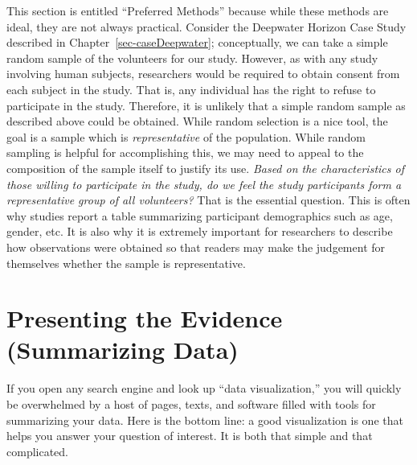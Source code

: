 \documentclass[
  letterpaper,
  DIV=11,
  numbers=noendperiod]{scrreprt}
\theoremstyle{definition}
\theoremstyle{definition}
\theoremstyle{plain}
\theoremstyle{remark}
\begin{document}
This section is entitled ``Preferred Methods'' because while these
methods are ideal, they are not always practical. Consider the Deepwater
Horizon Case Study described in Chapter~\ref{sec-caseDeepwater};
conceptually, we can take a simple random sample of the volunteers for
our study. However, as with any study involving human subjects,
researchers would be required to obtain consent from each subject in the
study. That is, any individual has the right to refuse to participate in
the study. Therefore, it is unlikely that a simple random sample as
described above could be obtained. While random selection is a nice
tool, the goal is a sample which is \emph{representative} of the
population. While random sampling is helpful for accomplishing this, we
may need to appeal to the composition of the sample itself to justify
its use. \emph{Based on the characteristics of those willing to
participate in the study, do we feel the study participants form a
representative group of all volunteers?} That is the essential question.
This is often why studies report a table summarizing participant
demographics such as age, gender, etc. It is also why it is extremely
important for researchers to describe how observations were obtained so
that readers may make the judgement for themselves whether the sample is
representative.

\hypertarget{sec-summaries}{%
\chapter{Presenting the Evidence (Summarizing
Data)}\label{sec-summaries}}

\providecommand{\norm}[1]{\lVert#1\rVert}
\providecommand{\abs}[1]{\lvert#1\rvert}
\providecommand{\iid}{\stackrel{\text{IID}}{\sim}}
\providecommand{\ind}{\stackrel{\text{Ind}}{\sim}}

\providecommand{\bm}[1]{\mathbf{#1}}
\providecommand{\bs}[1]{\boldsymbol{#1}}
\providecommand{\bbeta}{\bs{\beta}}

\providecommand{\Ell}{\mathcal{L}}
\providecommand{\indep}{\perp\negthickspace\negmedspace\perp}

If you open any search engine and look up ``data visualization,'' you
will quickly be overwhelmed by a host of pages, texts, and software
filled with tools for summarizing your data. Here is the bottom line: a
good visualization is one that helps you answer your question of
interest. It is both that simple and that complicated.
\end{document}
